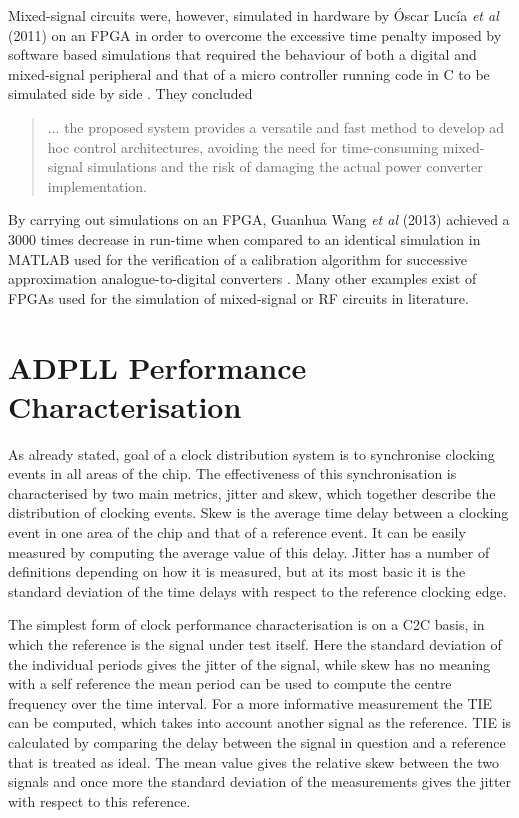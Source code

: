 Mixed-signal circuits were, however, simulated in hardware by \'{O}scar Luc\'{i}a \textit{et al} (2011) on an \ac{FPGA} in order to overcome the excessive time penalty imposed by software based simulations that required the behaviour of both a digital and mixed-signal peripheral and that of a micro controller running code in C to be simulated side by side \cite{lucia2011real}. They concluded
\begin{quotation}
	... the proposed system provides a versatile and fast method to develop ad hoc control architectures, avoiding the need for time-consuming mixed-signal simulations and the risk of damaging the actual power converter implementation.

\end{quotation}
By carrying out simulations on an \ac{FPGA}, Guanhua Wang \textit{et al} (2013) achieved a 3000 times decrease in run-time when compared to an identical simulation in MATLAB used for the verification of a calibration algorithm for successive approximation analogue-to-digital converters \cite{wang2013fast}. Many other examples exist of \ac{FPGA}s used for the simulation of mixed-signal or \acl{RF} circuits in literature.

\section{\ac{ADPLL} Performance Characterisation}
As already stated, goal of a clock distribution system is to synchronise clocking events in all areas of the chip. The effectiveness of this synchronisation is characterised by two main metrics, jitter and skew, which together describe the distribution of clocking events. Skew is the average time delay between a clocking event in one area of the chip and that of a reference event. It can be easily measured by computing the average value of this delay. Jitter has a number of definitions depending on how it is measured, but at its most basic it is the standard deviation of the time delays with respect to the reference clocking edge.

The simplest form of clock performance characterisation is on a \ac{C2C} basis, in which the reference is the signal under test itself. Here the standard deviation of the individual periods gives the jitter of the signal, while skew has no meaning with a self reference the mean period can be used to compute the centre frequency over the time interval. For a more informative measurement the \ac{TIE} can be computed, which takes into account another signal as the reference. \ac{TIE} is calculated by comparing the delay between the signal in question and a reference that is treated as ideal. The mean value gives the relative skew between the two signals and once more the standard deviation of the measurements gives the jitter with respect to this reference.

